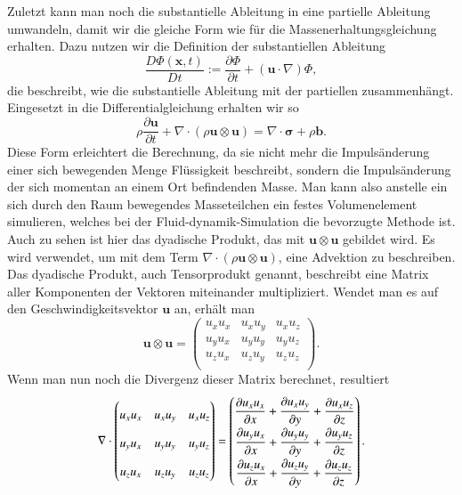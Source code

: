Zuletzt kann man noch die substantielle Ableitung in eine partielle Ableitung umwandeln, damit wir die gleiche Form wie für die Massenerhaltungsgleichung erhalten.
%
Dazu nutzen wir die Definition der substantiellen Ableitung
\[
\frac{D\Phi(\mathbf{x},t)}{Dt}
:=
\frac{\partial \Phi}{\partial t}+(\mathbf{u}\cdot \nabla)\Phi
,\] 
die beschreibt, wie die substantielle Ableitung mit der partiellen zusammenhängt.
Eingesetzt in die Differentialgleichung erhalten wir so 
\begin{equation}
\label{openfoam:euler2}
\rho\frac{\partial\mathbf{u}}{\partial t} + \nabla \cdot(\rho\mathbf{u}\otimes \mathbf{u})
= 
\nabla \cdot \mathbf{\sigma} +\rho \mathbf{b}.
\end{equation}
Diese Form erleichtert die Berechnung, da sie nicht mehr die Impulsänderung einer sich bewegenden Menge Flüssigkeit beschreibt, sondern die Impulsänderung der sich momentan an einem Ort befindenden Masse. 
Man kann also anstelle ein sich durch den Raum bewegendes Masseteilchen ein festes Volumenelement simulieren, welches bei der Fluid-dynamik-Simulation die bevorzugte Methode ist.
Auch zu sehen ist hier das dyadische Produkt, das mit $\mathbf{u}\otimes \mathbf{u}$ gebildet wird.
%
Es wird verwendet, um mit dem Term $\nabla \cdot(\rho\mathbf{u}\otimes \mathbf{u})$, eine Advektion zu beschreiben.
Das dyadische Produkt, auch Tensorprodukt genannt, beschreibt eine Matrix aller Komponenten der Vektoren miteinander multipliziert.
%
Wendet man es auf den Geschwindigkeitsvektor $\mathbf{u}$ an, erhält man
\begin{equation}
\mathbf{u}\otimes \mathbf{u}
= 
\begin{pmatrix}
	u_x u_x &  u_x u_y & u_x u_z \\
	u_y u_x &  u_y u_y & u_y u_z \\
	u_z u_x &  u_z u_y & u_z u_z \\
\end{pmatrix}
.
\end{equation}
Wenn man nun noch die Divergenz dieser Matrix berechnet, resultiert
\begin{equation}
\nabla \cdot 
\begin{pmatrix}
	u_x u_x &  u_x u_y & u_x u_z \\
	u_y u_x &  u_y u_y & u_y u_z \\
	u_z u_x &  u_z u_y & u_z u_z \\
\end{pmatrix}
= 
\renewcommand{\arraystretch}{1.9}
\begin{pmatrix}
\displaystyle
	\frac{\partial u_x u_x}{\partial x} +  \frac{\partial u_x u_y}{\partial y} + \frac{\partial u_x u_z}{\partial z} \\
\displaystyle
	\frac{\partial u_y u_x}{\partial x} +  \frac{\partial u_y u_y}{\partial y} + \frac{\partial u_y u_z}{\partial z} \\
\displaystyle
	\frac{\partial u_z u_x}{\partial x} +  \frac{\partial u_z u_y}{\partial y} + \frac{\partial u_z u_z}{\partial z}  \\
\end{pmatrix}
.
\end{equation}

